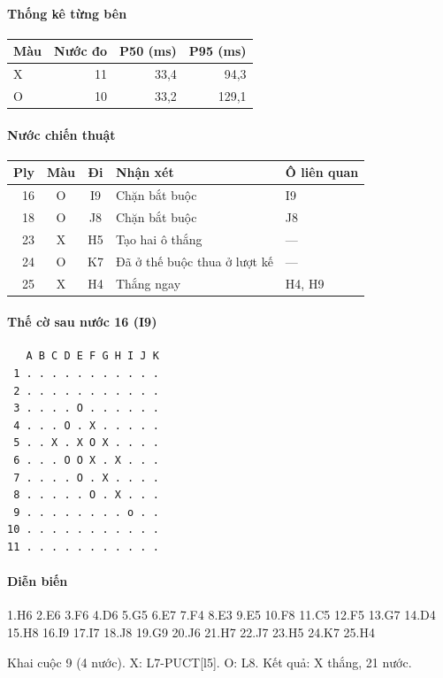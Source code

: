 \paragraph{Thống kê từng bên}
\begin{center}\small
\begin{tabular}{@{}lrrr@{}}
\toprule
Màu & Nước đo & P50 (ms) & P95 (ms) \\
\midrule
X & 11 & 33,4 & 94,3 \\
O & 10 & 33,2 & 129,1 \\
\bottomrule
\end{tabular}
\end{center}
\paragraph{Nước chiến thuật}
\begin{center}\small
\begin{tabular}{@{}rccll@{}}
\toprule
Ply & Màu & Đi & Nhận xét & Ô liên quan \\
\midrule
16 & O & I9 & Chặn bắt buộc & I9 \\
18 & O & J8 & Chặn bắt buộc & J8 \\
23 & X & H5 & Tạo hai ô thắng & — \\
24 & O & K7 & Đã ở thế buộc thua ở lượt kế & — \\
25 & X & H4 & Thắng ngay & H4, H9 \\
\bottomrule
\end{tabular}
\end{center}
\paragraph{Thế cờ sau nước 16 (I9)}
\begin{verbatim}
   A B C D E F G H I J K
 1 . . . . . . . . . . .
 2 . . . . . . . . . . .
 3 . . . . O . . . . . .
 4 . . . O . X . . . . .
 5 . . X . X O X . . . .
 6 . . . O O X . X . . .
 7 . . . . O . X . . . .
 8 . . . . . O . X . . .
 9 . . . . . . . . o . .
10 . . . . . . . . . . .
11 . . . . . . . . . . .
\end{verbatim}
\paragraph{Diễn biến}
{\footnotesize 1.H6 2.E6 3.F6 4.D6 5.G5 6.E7 7.F4 8.E3 9.E5 10.F8 11.C5 12.F5 13.G7 14.D4 15.H8 16.I9 17.I7 18.J8 19.G9 20.J6 21.H7 22.J7 23.H5 24.K7 25.H4\par}
Khai cuộc 9 (4 nước). X: L7-PUCT[l5]. O: L8. Kết quả: X thắng, 21 nước.

